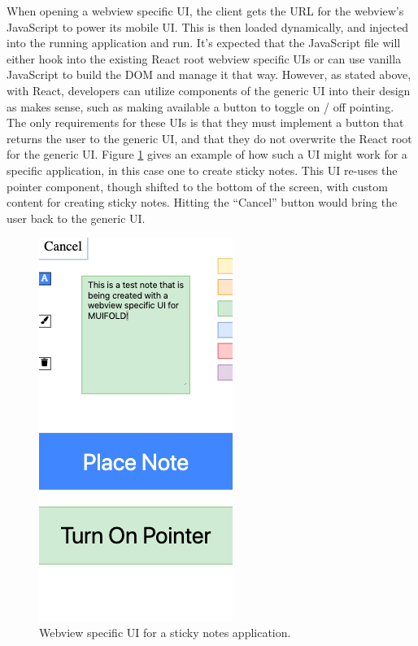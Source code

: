 When opening a webview specific UI, the client gets the
URL for the webview's JavaScript to power its mobile UI. This
is then loaded dynamically, and injected into the running
application and run. It's expected that the JavaScript file will
either hook into the existing React root webview specific UIs or
can use vanilla JavaScript to build the DOM and manage it that way.
However, as stated above, with React, developers can utilize
components of the generic UI into their design as makes sense,
such as making available a button to toggle on / off pointing. The
only requirements for these UIs is that they must implement a button
that returns the user to the generic UI, and that they do not
overwrite the React root for the generic UI. Figure
\ref{fig:application_specific_ui} gives an example of how such
a UI might work for a specific application, in this case one
to create sticky notes. This UI re-uses the pointer component,
though shifted to the bottom of the screen, with custom content
for creating sticky notes. Hitting the ``Cancel'' button would
bring the user back to the generic UI.

\begin{figure}
\centering
  \includegraphics[width=0.40\columnwidth]{figures/application_specific_ui}
  \caption{Webview specific UI for a sticky notes application.}
  \label{fig:application_specific_ui}
\end{figure}
